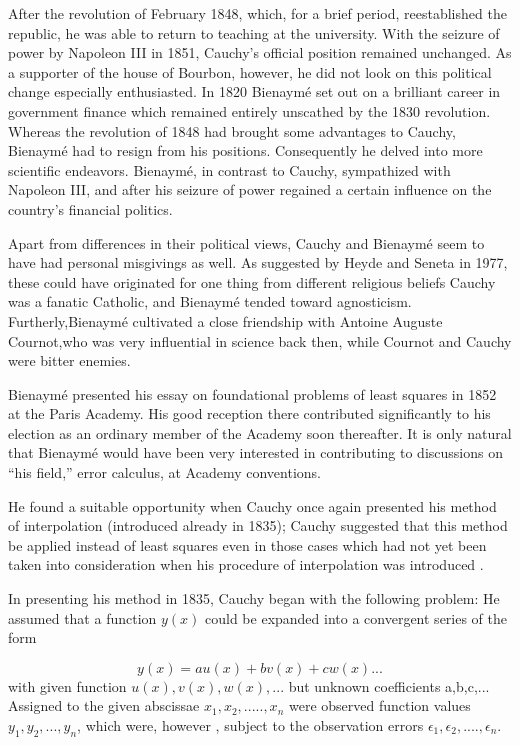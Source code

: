 \documentclass{article}
\begin{document}
After the revolution of February 1848, which, for a brief period, reestablished the republic, he was able to return to teaching at the university. With the seizure of power by Napoleon III in 1851, Cauchy’s official position remained unchanged.
As a supporter of the house of Bourbon, however, he did not look on this political change especially enthusiasted.
In 1820 Bienaymé \cite{Fischer2010History} set out on a brilliant career in government finance which remained entirely unscathed by the 1830 revolution. Whereas the revolution of 1848
had brought some advantages to Cauchy, Bienaymé had to resign from his positions. Consequently he delved into more scientific endeavors. Bienaymé, in contrast to Cauchy, sympathized with Napoleon III, and after his seizure of power regained
a certain influence on the country’s financial politics.

Apart from differences in their political views, Cauchy and Bienaymé seem to have had personal misgivings as well. As suggested by Heyde and Seneta in 1977, these could have originated for one thing from different religious beliefs Cauchy was a fanatic Catholic, and Bienaymé tended toward agnosticism.
Furtherly,Bienaymé cultivated a close friendship with Antoine Auguste Cournot,who was very influential in science back then, while Cournot and Cauchy were bitter enemies.

Bienaymé presented his essay on foundational problems of least squares in 1852 at the Paris Academy.
His good reception there contributed significantly to his election as an ordinary member of the Academy soon thereafter.
It is only natural that Bienaymé would have been very interested in contributing to discussions on “his field,” error calculus, at Academy conventions.

He found a suitable opportunity when Cauchy once again presented his method of interpolation
(introduced already in 1835); Cauchy suggested that this method be applied instead of least squares even in those cases which had not yet been taken into consideration
when his procedure of interpolation was introduced \cite{Fischer2010History}.

In presenting his method in 1835, Cauchy began with the following problem: He assumed that a function $y(x)$ could be expanded into a convergent series of the form


\[y(x) = au(x) + bv(x)+cw(x) ...\]
with given function $ u(x),v(x),w(x),...$
but unknown coefficients a,b,c,... 
Assigned to the given abscissae $x_1,x_2,....., x_n$
were observed function values $ y_1,y_2,...,y_n$, which were, however , subject to the observation errors $\epsilon_1,\epsilon_2,....,\epsilon_n$. 
\end{document}

